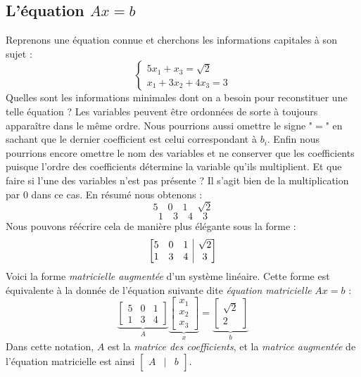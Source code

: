 \documentclass{article}
\begin{document}
\subsection{L'équation $Ax = b$}
\noindent Reprenons une équation connue et cherchons les informations capitales à son sujet : 
$$ \begin{cases}5x_1 + x_3 = \sqrt{2}\\x_1 + 3x_2 +4x_3 = 3\end{cases} $$
\noindent Quelles sont les informations minimales dont on a besoin pour reconstituer une telle équation ? Les variables peuvent être ordonnées de sorte à toujours apparaître dans le même ordre. Nous pourrions aussi omettre le signe "$=$" en sachant que le dernier coefficient est celui correspondant à $b_i$. Enfin nous pourrions encore omettre le nom des variables et ne conserver que les coefficients puisque l'ordre des coefficients détermine la variable qu'ils multiplient. Et que faire si l'une des variables n'est pas présente ? Il s'agit bien de la multiplication par $0$ dans ce cas. En résumé nous obtenons :
$$ 5 \quad 0 \quad 1 \quad \sqrt{2}$$
$$ 1 \quad 3 \quad 4 \quad 3 $$
Nous pouvons réécrire cela de manière plus élégante sous la forme :
$$ 
\left[
\begin{array}{@{}ccc|c@{}}
5 & 0 & 1 & \sqrt{2} \\
1 & 3 & 4 & 3 \\
\end{array}
\right]
$$
\noindent Voici la forme \textit{matricielle augmentée} d'un système linéaire. Cette forme est équivalente à la donnée de l'équation suivante dite \textit{équation matricielle} $Ax = b$ :
$$\underbrace{\begin{bmatrix}
5 & 0 & 1 \\
1 & 3 & 4 
\end{bmatrix}}_{A}\underbrace{\begin{bmatrix}
x_1 \\ x_2 \\ x_3
\end{bmatrix}}_{x} = \underbrace{\begin{bmatrix}
\sqrt{2} \\ 2
\end{bmatrix}}_{b}
$$
Dans cette notation, $A$ est la \textit{matrice des coefficients}, et la \textit{matrice augmentée} de l'équation matricielle est ainsi $\begin{bmatrix}
A & | & b
\end{bmatrix}$.
\end{document}
